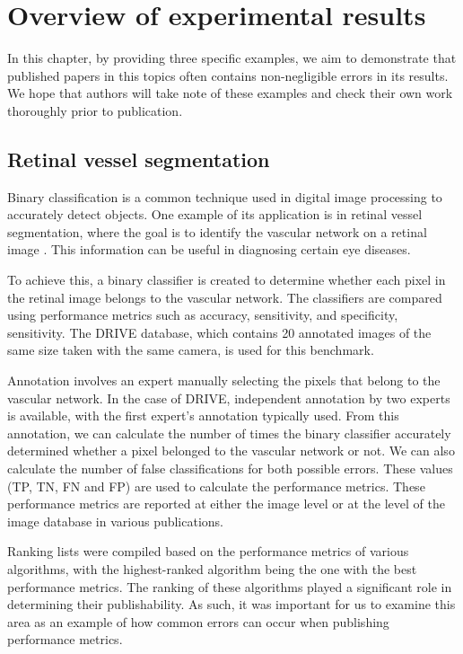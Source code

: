 \documentclass[3p,times]{elsarticle}
\begin{document}
\section{Overview of experimental results}
In this chapter, by providing three specific examples, we aim to demonstrate that published papers in this topics often contains non-negligible errors in its results. We hope that authors will take note of these examples and check their own work thoroughly prior to publication.

\subsection{Retinal vessel segmentation}
Binary classification is a common technique used in digital image processing to accurately detect objects. One example of its application is in retinal vessel segmentation, where the goal is to identify the vascular network on a retinal image \cite{8}. This information can be useful in diagnosing certain eye diseases.

To achieve this, a binary classifier is created to determine whether each pixel in the retinal image belongs to the vascular network. The classifiers are compared using performance metrics such as accuracy, sensitivity, and specificity, sensitivity. The DRIVE database, which contains 20 annotated images of the same size taken with the same camera, is used for this benchmark.

Annotation involves an expert manually selecting the pixels that belong to the vascular network. In the case of DRIVE, independent annotation by two experts is available, with the first expert’s annotation typically used. From this annotation, we can calculate the number of times the binary classifier accurately determined whether a pixel belonged to the vascular network or not. We can also calculate the number of false classifications for both possible errors. These values (TP, TN, FN and FP) are used to calculate the performance metrics. These performance metrics are reported at either the image level or at the level of the image database in various publications.

Ranking lists were compiled based on the performance metrics of various algorithms, with the highest-ranked algorithm being the one with the best performance metrics. The ranking of these algorithms played a significant role in determining their publishability. As such, it was important for us to examine this area as an example of how common errors can occur when publishing performance metrics.
\end{document}
